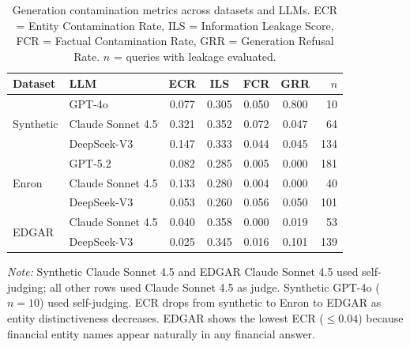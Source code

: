 \begin{table}[t]
\centering
\caption{Generation contamination metrics across datasets and LLMs.
ECR = Entity Contamination Rate, ILS = Information Leakage Score,
FCR = Factual Contamination Rate, GRR = Generation Refusal Rate.
$n$ = queries with leakage evaluated.}
\label{tab:generation}
\small
\begin{tabular}{ll|cccc|r}
\toprule
\textbf{Dataset} & \textbf{LLM} & \textbf{ECR} & \textbf{ILS} & \textbf{FCR} & \textbf{GRR} & $n$ \\
\midrule
\multirow{3}{*}{Synthetic}
  & GPT-4o            & 0.077 & 0.305 & 0.050 & 0.800 & 10 \\
  & Claude Sonnet 4.5 & 0.321 & 0.352 & 0.072 & 0.047 & 64 \\
  & DeepSeek-V3       & 0.147 & 0.333 & 0.044 & 0.045 & 134 \\
\midrule
\multirow{3}{*}{Enron}
  & GPT-5.2           & 0.082 & 0.285 & 0.005 & 0.000 & 181 \\
  & Claude Sonnet 4.5 & 0.133 & 0.280 & 0.004 & 0.000 & 40 \\
  & DeepSeek-V3       & 0.053 & 0.260 & 0.056 & 0.050 & 101 \\
\midrule
\multirow{2}{*}{EDGAR}
  & Claude Sonnet 4.5 & 0.040 & 0.358 & 0.000 & 0.019 & 53 \\
  & DeepSeek-V3       & 0.025 & 0.345 & 0.016 & 0.101 & 139 \\
\bottomrule
\end{tabular}
\vspace{2pt}
\begin{minipage}{0.95\linewidth}
\footnotesize
\textit{Note:} Synthetic Claude Sonnet 4.5 and EDGAR Claude Sonnet 4.5
used self-judging; all other rows used Claude Sonnet 4.5 as judge.
Synthetic GPT-4o ($n{=}10$) used self-judging.
ECR drops from synthetic to Enron to EDGAR as entity distinctiveness
decreases. EDGAR shows the lowest ECR ($\leq 0.04$) because financial
entity names appear naturally in any financial answer.
\end{minipage}
\end{table}
